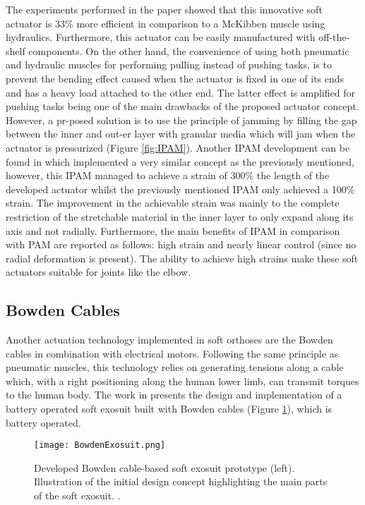 The experiments performed in the paper showed that this innovative soft actuator is 33\% more efficient in comparison to a McKibben muscle using hydraulics. Furthermore, this actuator can be easily manufactured with off-the-shelf components. On the other hand, the convenience of using both pneumatic and hydraulic muscles for performing pulling instead of pushing tasks, is to prevent the bending effect caused when the actuator is fixed in one of its ends and has a heavy load attached to the other end. The latter effect is amplified for pushing tasks being one of the main drawbacks of the proposed actuator concept. However, a pr-posed solution is to use the principle of jamming by filling the gap between the inner and out-er layer with granular media which will jam when the actuator is pressurized (Figure \ref{fig:IPAM}). Another IPAM development can be found in \cite{Hawkes2016} which implemented a very similar concept as the previously mentioned, however, this IPAM managed to achieve a strain of 300\% the length of the developed actuator whilst the previously mentioned IPAM only achieved a 100\% strain. The improvement in the achievable strain was mainly to the complete restriction of the stretchable material in the inner layer to only expand along its axis and not radially. Furthermore, the main benefits of IPAM in comparison with PAM are reported as follows: high strain and nearly linear control (since no radial deformation is present). The ability to achieve high strains make these soft actuators suitable for joints like the elbow.

\subsection{Bowden Cables}

Another actuation technology implemented in soft orthoses are the Bowden cables in combination with electrical motors. Following the same principle as pneumatic muscles, this technology relies on generating tensions along a cable which, with a right positioning along the human lower limb, can transmit torques to the human body. The work in \cite{Asbeck2013} presents the design and implementation of a battery operated soft exosuit built with Bowden cables (Figure \ref{fig:bowden_exo}), which is battery operated. 

\begin{figure}[hb!]
    \centering
    \texttt{[image: BowdenExosuit.png]}
    \caption{Developed Bowden cable-based soft exosuit prototype (left). Illustration of the initial design concept highlighting the main parts of the soft exosuit. \cite{Asbeck2013}. }
    \label{fig:bowden_exo}
\end{figure}

